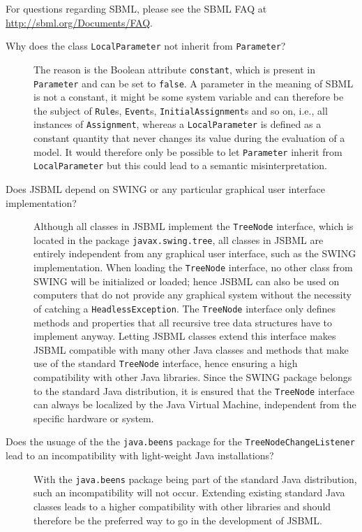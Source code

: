 For questions regarding SBML, please see the SBML FAQ at
\url{http://sbml.org/Documents/FAQ}.
\begin{description}
\item[Why does the class \texttt{LocalParameter} not inherit from
\texttt{Parameter}?]
The reason is the Boolean
attribute \texttt{constant}, which is present in
\texttt{Parameter} and can be set to \texttt{false}. A parameter in the meaning
of SBML is not a constant, it might be some system variable
and can therefore be the subject of \texttt{Rule}s,
\texttt{Event}s, \texttt{InitialAssignment}s
and so on, i.e., all instances of \texttt{Assignment},
whereas a \texttt{LocalParameter} is defined as a constant quantity that never
changes its value during the evaluation of a model. It would
therefore only be possible to let \texttt{Parameter} inherit from
\texttt{LocalParameter} but this could lead to a semantic misinterpretation.

\item[Does JSBML depend on SWING or any particular graphical user interface
implementation?]
Although all classes in JSBML implement the \texttt{TreeNode} interface, which
is located in the package \texttt{javax.swing.tree}, all classes in JSBML are
entirely independent from any graphical user interface, such as the SWING
implementation. When loading the \texttt{TreeNode} interface, no other class
from SWING will be initialized or loaded; hence JSBML can also be used on
computers that do not provide any graphical system without the necessity of
catching a \texttt{HeadlessException}. The \texttt{TreeNode} interface only
defines methods and properties that all recursive tree data structures have to
implement anyway. Letting JSBML classes extend this interface makes JSBML
compatible with many other Java classes and methods that make use of the
standard \texttt{TreeNode} interface, hence ensuring a high compatibility with
other Java libraries. Since the SWING package belongs to the standard
Java\texttrademark{} distribution, it is ensured that the \texttt{TreeNode}
interface can always be localized by the Java Virtual Machine,
independent from the specific hardware or system.

\item[Does the usuage of the the \texttt{java.beens} package for the
\texttt{TreeNodeChangeListener} lead to an incompatibility with light-weight
Java installations?]
With the \texttt{java.beens} package being part of the standard Java
distribution, such an incompatibility will not occur. Extending existing
standard Java classes leads to a higher compatibility with other libraries and
should therefore be the preferred way to go in the development of JSBML.

\end{description}
